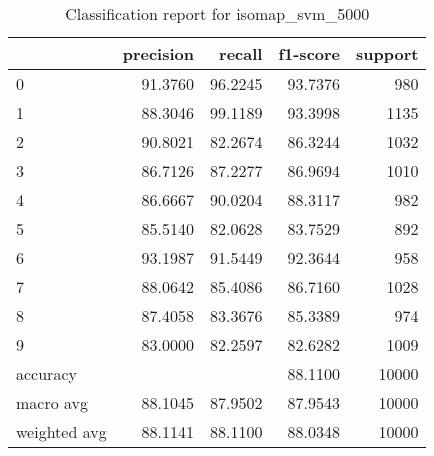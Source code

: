 \begin{table}[htb!]
\centering
\begin{tabular}{lrrrr}
    \toprule
    & precision & recall & f1-score & support \\
    \midrule
    0 & 91.3760 & 96.2245 & 93.7376 & 980 \\
    1 & 88.3046 & 99.1189 & 93.3998 & 1135 \\
    2 & 90.8021 & 82.2674 & 86.3244 & 1032 \\
    3 & 86.7126 & 87.2277 & 86.9694 & 1010 \\
    4 & 86.6667 & 90.0204 & 88.3117 & 982 \\
    5 & 85.5140 & 82.0628 & 83.7529 & 892 \\
    6 & 93.1987 & 91.5449 & 92.3644 & 958 \\
    7 & 88.0642 & 85.4086 & 86.7160 & 1028 \\
    8 & 87.4058 & 83.3676 & 85.3389 & 974 \\
    9 & 83.0000 & 82.2597 & 82.6282 & 1009 \\
    accuracy & & & 88.1100 & 10000 \\
    macro avg & 88.1045 & 87.9502 & 87.9543 & 10000 \\
    weighted avg & 88.1141 & 88.1100 & 88.0348 & 10000 \\
    \bottomrule
\end{tabular}
\caption{Classification report for isomap_svm_5000}
\label{tab:classification-report-isomap_svm_5000}
\end{table}
